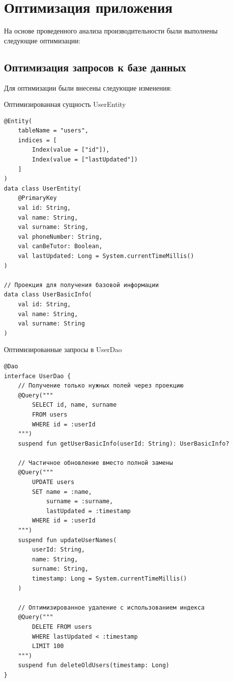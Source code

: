 \documentclass[14pt, russian]{scrartcl}
\begin{document}
\section{Оптимизация приложения}\label{sect:optimization}

На основе проведенного анализа производительности были выполнены следующие оптимизации:

\subsection{Оптимизация запросов к базе данных}\label{sect:db-optimization}

Для оптимизации были внесены следующие изменения:

\begin{listing}[!htb]
\caption{Оптимизированная сущность UserEntity}
\vspace{-0.3cm}
\label{lst:optimized-entity}
\begin{verbatim}
@Entity(
    tableName = "users",
    indices = [
        Index(value = ["id"]),
        Index(value = ["lastUpdated"])
    ]
)
data class UserEntity(
    @PrimaryKey
    val id: String,
    val name: String,
    val surname: String,
    val phoneNumber: String,
    val canBeTutor: Boolean,
    val lastUpdated: Long = System.currentTimeMillis()
)

// Проекция для получения базовой информации
data class UserBasicInfo(
    val id: String,
    val name: String,
    val surname: String
)
\end{verbatim}
\end{listing}

\begin{listing}[!htb]
\caption{Оптимизированные запросы в UserDao}
\vspace{-0.3cm}
\label{lst:optimized-dao}
\begin{verbatim}
@Dao
interface UserDao {
    // Получение только нужных полей через проекцию
    @Query("""
        SELECT id, name, surname 
        FROM users 
        WHERE id = :userId
    """)
    suspend fun getUserBasicInfo(userId: String): UserBasicInfo?
    
    // Частичное обновление вместо полной замены
    @Query("""
        UPDATE users 
        SET name = :name, 
            surname = :surname,
            lastUpdated = :timestamp 
        WHERE id = :userId
    """)
    suspend fun updateUserNames(
        userId: String, 
        name: String, 
        surname: String,
        timestamp: Long = System.currentTimeMillis()
    )
    
    // Оптимизированное удаление с использованием индекса
    @Query("""
        DELETE FROM users 
        WHERE lastUpdated < :timestamp
        LIMIT 100
    """)
    suspend fun deleteOldUsers(timestamp: Long)
}
\end{verbatim}
\end{listing}
\end{document}
